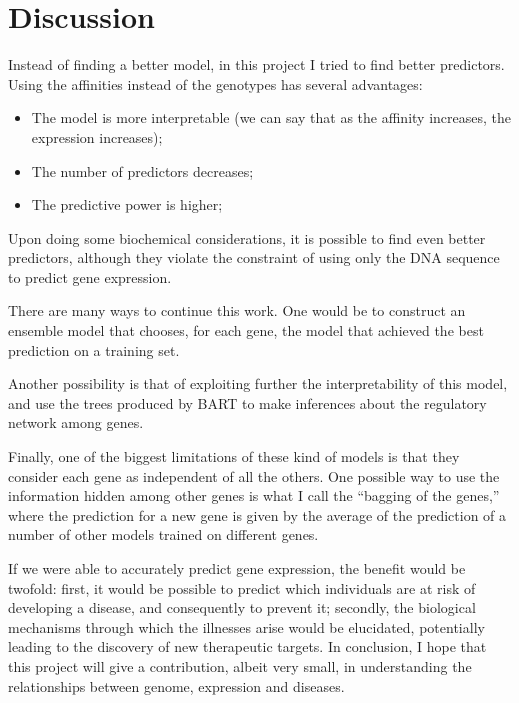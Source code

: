 \section{Discussion}

Instead of finding a better model, in this project I tried to find 
better predictors. Using the affinities instead of the genotypes has 
several advantages:

\begin{itemize}
  \item The model is more interpretable (\eg we can say that as the 
affinity increases, the expression increases);
  \item The number of predictors decreases;
  \item The predictive power is higher;
\end{itemize}

Upon doing some biochemical considerations, it is possible to find even 
better predictors, although they violate the constraint of using only 
the DNA sequence to predict gene expression.

There are many ways to continue this work. One would be to construct an 
ensemble model that chooses, for each gene, the model that achieved the 
best prediction on a training set.

Another possibility is that of exploiting further the interpretability 
of this model, and use the trees produced by BART to make inferences 
about the regulatory network among genes.

Finally, one of the biggest limitations of these kind of models is that 
they consider each gene as independent of all the others. One possible 
way to use the information hidden among other genes is what I call the 
\enquote{bagging of the genes,} where the prediction for a new gene is 
given by the average of the prediction of a number of other models 
trained on different genes.

If we were able to accurately predict gene expression, the benefit would 
be twofold: first, it would be possible to predict which individuals are 
at risk of developing a disease, and consequently to prevent it; 
secondly, the biological mechanisms through which the illnesses arise 
would be elucidated, potentially leading to the discovery of new 
therapeutic targets. In conclusion, I hope that this project will give a 
contribution, albeit very small, in understanding the relationships 
between genome, expression and diseases.
